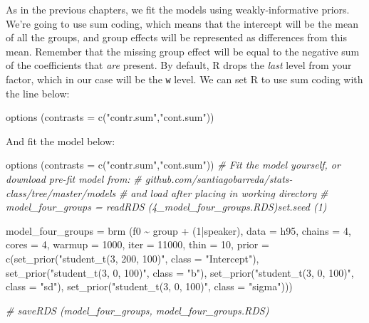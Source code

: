 \documentclass[
]{book}
\newenvironment{Shaded}{\begin{snugshade}}{\end{snugshade}}
\newcommand{\AttributeTok}[1]{\textcolor[rgb]{0.77,0.63,0.00}{#1}}
\newcommand{\CommentTok}[1]{\textcolor[rgb]{0.56,0.35,0.01}{\textit{#1}}}
\newcommand{\DecValTok}[1]{\textcolor[rgb]{0.00,0.00,0.81}{#1}}
\newcommand{\FunctionTok}[1]{\textcolor[rgb]{0.00,0.00,0.00}{#1}}
\newcommand{\NormalTok}[1]{#1}
\newcommand{\OtherTok}[1]{\textcolor[rgb]{0.56,0.35,0.01}{#1}}
\newcommand{\SpecialCharTok}[1]{\textcolor[rgb]{0.00,0.00,0.00}{#1}}
\newcommand{\StringTok}[1]{\textcolor[rgb]{0.31,0.60,0.02}{#1}}
\begin{document}
As in the previous chapters, we fit the models using weakly-informative priors. We're going to use sum coding, which means that the intercept will be the mean of all the groups, and group effects will be represented as differences from this mean. Remember that the missing group effect will be equal to the negative sum of the coefficients that \emph{are} present. By default, R drops the \emph{last} level from your factor, which in our case will be the \texttt{w} level. We can set R to use sum coding with the line below:

\begin{Shaded}
\begin{Highlighting}[]
\FunctionTok{options}\NormalTok{ (}\AttributeTok{contrasts =} \FunctionTok{c}\NormalTok{(}\StringTok{"contr.sum"}\NormalTok{,}\StringTok{"cont.sum"}\NormalTok{))}
\end{Highlighting}
\end{Shaded}

And fit the model below:

\begin{Shaded}
\begin{Highlighting}[]
\FunctionTok{options}\NormalTok{ (}\AttributeTok{contrasts =} \FunctionTok{c}\NormalTok{(}\StringTok{"contr.sum"}\NormalTok{,}\StringTok{"cont.sum"}\NormalTok{))}
\CommentTok{\# Fit the model yourself, or download pre{-}fit model from: }
\CommentTok{\# github.com/santiagobarreda/stats{-}class/tree/master/models}
\CommentTok{\# and load after placing in working directory}
\CommentTok{\#  model\_four\_groups = readRDS (\textquotesingle{}4\_model\_four\_groups.RDS\textquotesingle{})set.seed (1)}

\NormalTok{model\_four\_groups }\OtherTok{=}  
  \FunctionTok{brm}\NormalTok{ (f0 }\SpecialCharTok{\textasciitilde{}}\NormalTok{ group }\SpecialCharTok{+}\NormalTok{ (}\DecValTok{1}\SpecialCharTok{|}\NormalTok{speaker), }\AttributeTok{data =}\NormalTok{ h95, }\AttributeTok{chains =} \DecValTok{4}\NormalTok{, }\AttributeTok{cores =} \DecValTok{4}\NormalTok{, }
       \AttributeTok{warmup =} \DecValTok{1000}\NormalTok{, }\AttributeTok{iter =} \DecValTok{11000}\NormalTok{, }\AttributeTok{thin =} \DecValTok{10}\NormalTok{, }
       \AttributeTok{prior =} \FunctionTok{c}\NormalTok{(}\FunctionTok{set\_prior}\NormalTok{(}\StringTok{"student\_t(3, 200, 100)"}\NormalTok{, }\AttributeTok{class =} \StringTok{"Intercept"}\NormalTok{),}
                              \FunctionTok{set\_prior}\NormalTok{(}\StringTok{"student\_t(3, 0, 100)"}\NormalTok{, }\AttributeTok{class =} \StringTok{"b"}\NormalTok{),}
                              \FunctionTok{set\_prior}\NormalTok{(}\StringTok{"student\_t(3, 0, 100)"}\NormalTok{, }\AttributeTok{class =} \StringTok{"sd"}\NormalTok{),}
                              \FunctionTok{set\_prior}\NormalTok{(}\StringTok{"student\_t(3, 0, 100)"}\NormalTok{, }\AttributeTok{class =} \StringTok{"sigma"}\NormalTok{)))}

\CommentTok{\#  saveRDS (model\_four\_groups, \textquotesingle{}model\_four\_groups.RDS\textquotesingle{})}
\end{Highlighting}
\end{Shaded}
\end{document}

